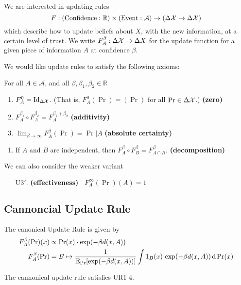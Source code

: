 \documentclass{article}
\DeclareMathOperator{\supp}{\mathrm{Supp}}
\begin{document}
We are interested in updating rules
\[ 
    F: (\text{Confidence} : \mathbb R) \times (\text{Event} : \mathcal A) \to (\Delta\mathcal X  \to \Delta \mathcal X) 
\]
which describe how to update beliefs about $X$, with the new information, at a certain level of trust. We write $F^\beta_A : \Delta\mathcal X \to \Delta X$ for the update function for a given piece of information $A$ at confidence $\beta$.

We would like update rules to satisfy the following axioms:

For all $A \in \mathcal A$, and all $\beta,\beta_1, \beta_2 \in \mathbb R$
\begin{enumerate}[label=UR\arabic{*}.,nosep]
    \item  $F^{0}_A  =  \mathrm{Id}_{\Delta\mathcal X}$. (That is, $F^{0}_A(\Pr) = (\Pr)$ for all $\Pr \in \Delta\mathcal X$.) 
        \hfill \textbf{(zero)}
    \item $F^{\beta_1}_A \circ F^{\beta_2}_A = F^{\beta_1 + \beta_2}_A$
        \hfill \textbf{(additivity)}
    \item $\displaystyle \lim_{\beta\to\infty} F^\beta_A (\Pr) = \Pr|A$
        \hfill \textbf{(absolute certainty)}
\end{enumerate}

\begin{enumerate}[resume,label=UR\arabic{*}.]
    \item If $A$ and $B$ are independent, then $F^{\beta}_A \circ F^{\beta}_B = F^{\beta}_{A \cap B}$.
        \hfill \textbf{(decomposition)}
\end{enumerate}

We can also consider the weaker variant
\begin{enumerate}
    \item[U3$'$.]  \textbf{(effectiveness)~} $F^\infty_A (\Pr)(A) = 1$

\end{enumerate}


\subsection*{Cannoncial Update Rule}
The canonical Update Rule is given by
\begin{align*}
    F^\beta_A(\Pr)(x) &\propto \Pr(x) \cdot \exp(-\beta d(x, A)) \\
    F^\beta_A(\Pr) &= B \mapsto \frac{1}{\operatorname*{\mathbb{E}}_{\Pr}[\exp(-\beta d(x,A))]}\int
        1_B(x) \, \exp(-\beta d(x, A)) \,\mathrm d\Pr(x)
\end{align*}
\begin{prop}
    The cannonical update rule satisfies UR1-4.
\end{prop}
\end{document}
